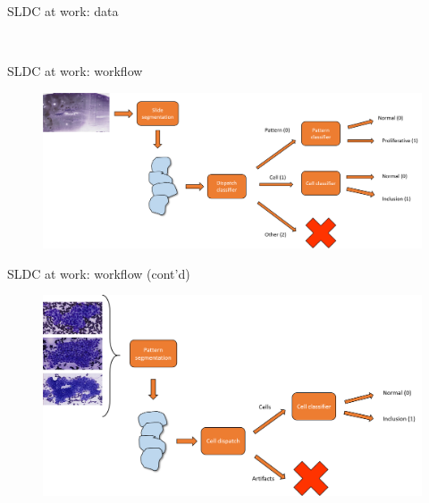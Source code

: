 \documentclass{beamer}
\begin{document}
\begin{frame}{SLDC at work: data}
\begin{figure}
		\\
	\end{figure}
\end{frame}

\begin{frame}{SLDC at work: workflow}
	\begin{figure}
		\includegraphics[scale=0.35]{images/thyroid_workflow_1.png}
	\end{figure}
\end{frame}

\begin{frame}{SLDC at work: workflow (cont'd)}
	\begin{figure}
		\includegraphics[scale=0.4]{images/thyroid_workflow_2.png}
	\end{figure}
\end{frame}
\end{document}
